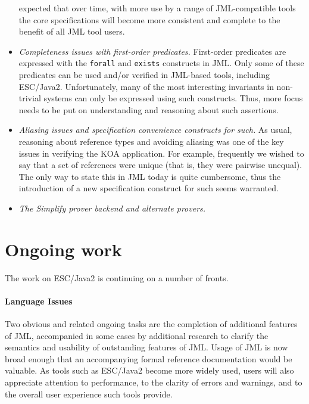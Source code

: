 \documentclass{llncs}
\begin{document}
\begin{itemize}
  expected that over time, with more use by a range of JML-compatible
  tools the core specifications will become more consistent and
  complete to the benefit of all JML tool users.
\item \emph{Completeness issues with first-order predicates.}
  First-order predicates are expressed with the \texttt{forall} and
  \texttt{exists} constructs in JML.  Only some of these predicates
  can be used and/or verified in JML-based tools, including ESC/Java2.
  Unfortunately, many of the most interesting invariants in
  non-trivial systems can only be expressed using such constructs.
  Thus, more focus needs to be put on understanding and reasoning
  about such assertions.
\item \emph{Aliasing issues and specification convenience constructs
    for such.}  As usual, reasoning about reference types and avoiding
  aliasing was one of the key issues in verifying the KOA application.
  For example, frequently we wished to say that a set of references
  were unique (that is, they were pairwise unequal).  The only way to
  state this in JML today is quite cumbersome, thus the introduction
  of a new specification construct for such seems warranted.
\item \emph{The Simplify prover backend and alternate provers.}
\end{itemize}


\section{Ongoing work}
The work on ESC/Java2 is continuing on a number of fronts.

\paragraph*{Language Issues} Two obvious and related ongoing tasks are
the completion of additional features of JML, accompanied in some
cases by additional research to clarify the semantics and usability of
outstanding features of JML.  Usage of JML is now broad enough that an
accompanying formal reference documentation would be valuable.  As
tools such as ESC/Java2 become more widely used, users will also
appreciate attention to performance, to the clarity of errors and
warnings, and to the overall user experience such tools provide.
\end{document}
